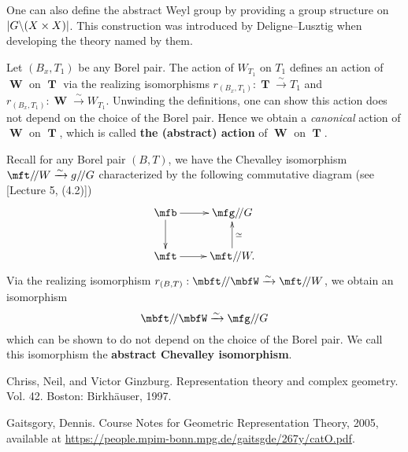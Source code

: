	\begin{rem}
		One can also define the abstract Weyl group by providing a group structure on $|G\backslash (X\mt X)|$. This construction was introduced by Deligne--Lusztig when developing the theory named by them.

	\end{rem}

	\begin{constr}
		Let $(B_x,T_1)$ be any Borel pair. The action of $W_{T_1}$ on $T_1$ defines an action of $\mbfW$ on $\mbfT$ via the realizing isomorphisms $r_{(B_x,T_1)}: \mbfT \xrightarrow{\sim} T_1$ and $r_{(B_x,T_1)}: \mbfW \xrightarrow{\sim} W_{T_1}$. Unwinding the definitions, one can show this action does not depend on the choice of the Borel pair. Hence we obtain a \emph{canonical} action of $\mbfW$ on $\mbfT$, which is called \textbf{the (abstract) action} of $\mbfW$ on $\mbfT$.
	\end{constr}

	\begin{constr}
		Recall for any Borel pair $(B,T)$, we have the Chevalley isomorphism $\mft/\!/W \xrightarrow{\sim} g/\!/G$ characterized by the following commutative diagram (see [Lecture 5, (4.2)])
		\[
			\xymatrix{
				\mfb \ar[r] \ar[d] & \mfg/\!/G \\
				\mft \ar[r] & \mft/\!/W. \ar[u]_-\simeq
			}
		\]
		Via the realizing isomorphism $r_{(B,T)}: \mbft/\!/\mbfW \xrightarrow{\sim} \mft/\!/W$, we obtain an isomorphism 
		\[
			\mbft/\!/\mbfW \xrightarrow{\sim} \mfg/\!/G
		\]
		which can be shown to do not depend on the choice of the Borel pair. We call this isomorphism the \textbf{abstract Chevalley isomorphism}.
	\end{constr}



	
	
	

\begin{thebibliography}{Yau}

	 Chriss, Neil, and Victor Ginzburg. Representation theory and complex geometry. Vol. 42. Boston: Birkhäuser, 1997.
	

	 Gaitsgory, Dennis. Course Notes for Geometric Representation Theory, 2005, available at \url{https://people.mpim-bonn.mpg.de/gaitsgde/267y/catO.pdf}.

\end{thebibliography}


 


